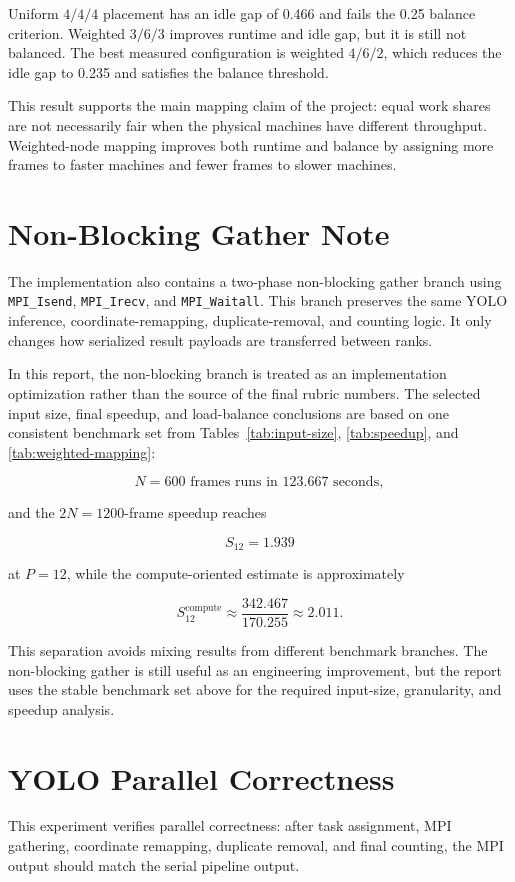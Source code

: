 Uniform $4/4/4$ placement has an idle gap of 0.466 and fails the 0.25 balance criterion. Weighted $3/6/3$ improves runtime and idle gap, but it is still not balanced. The best measured configuration is weighted $4/6/2$, which reduces the idle gap to 0.235 and satisfies the balance threshold.

This result supports the main mapping claim of the project: equal work shares are not necessarily fair when the physical machines have different throughput. Weighted-node mapping improves both runtime and balance by assigning more frames to faster machines and fewer frames to slower machines.


\section{Non-Blocking Gather Note}\label{sec:non-blocking-gather}

The implementation also contains a two-phase non-blocking gather branch using \texttt{MPI\_Isend}, \texttt{MPI\_Irecv}, and \texttt{MPI\_Waitall}. This branch preserves the same YOLO inference, coordinate-remapping, duplicate-removal, and counting logic. It only changes how serialized result payloads are transferred between ranks.

In this report, the non-blocking branch is treated as an implementation optimization rather than the source of the final rubric numbers. The selected input size, final speedup, and load-balance conclusions are based on one consistent benchmark set from Tables~\ref{tab:input-size}, \ref{tab:speedup}, and \ref{tab:weighted-mapping}:

\[
N = 600 \text{ frames runs in } 123.667 \text{ seconds},
\]

and the $2N = 1200$-frame speedup reaches

\[
S_{12} = 1.939
\]

at $P = 12$, while the compute-oriented estimate is approximately

\[
S_{12}^{\mathrm{compute}} \approx \frac{342.467}{170.255} \approx 2.011.
\]

This separation avoids mixing results from different benchmark branches. The non-blocking gather is still useful as an engineering improvement, but the report uses the stable benchmark set above for the required input-size, granularity, and speedup analysis.

\section{YOLO Parallel Correctness}
This experiment verifies parallel correctness: after task assignment, MPI gathering, coordinate remapping, duplicate removal, and final counting, the MPI output should match the serial pipeline output.

